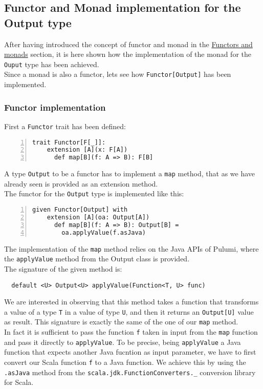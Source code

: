 \subsection{Functor and Monad implementation for the Output type}
After having introduced the concept of functor and monad in the \hyperref[sssec:functors-monads]{Functors and monads} section, it is here shown how the implementation of the monad for the \texttt{Ouput} type has been achieved.\\
Since a monad is also a functor, lets see how \texttt{Functor[Output]} has been implemented.

\subsubsection{Functor implementation}
First a \texttt{Functor} trait has been defined:\\
\begin{minipage}{\linewidth}
\begin{lstlisting}[numbers=left, numberstyle=\tiny, numbersep=-5pt, stepnumber=1, linewidth=420pt]
  trait Functor[F[_]]:
    extension [A](x: F[A])
      def map[B](f: A => B): F[B]
\end{lstlisting}
\end{minipage}
A type \texttt{Output} to be a functor has to implement a \texttt{map} method, that as we have already seen is provided as an extension method.\\
The functor for the \texttt{Output} type is implemented like this:\\
\begin{minipage}{\linewidth}
\begin{lstlisting}[numbers=left, numberstyle=\tiny, numbersep=-5pt, stepnumber=1, linewidth=420pt]
  given Functor[Output] with
    extension [A](oa: Output[A])
      def map[B](f: A => B): Output[B] =
        oa.applyValue(f.asJava)
\end{lstlisting}
\end{minipage}
The implementation of the \texttt{map} method relies on the Java APIs of Pulumi, where the \texttt{applyValue} method from the Output class is provided.\\
The signature of the given method is:
\begin{verbatim}
  default <U> Output<U> applyValue(Function<T, U> func)
\end{verbatim}
We are interested in observing that this method takes a function that transforms a value of a type \texttt{T} in a value of type \texttt{U}, and then it returns an \texttt{Output[U]} value as result.
This signature is exactly the same of the one of our \texttt{map} method.\\
In fact it is sufficient to pass the function \texttt{f} taken in input from the \texttt{map} function and pass it directly to \texttt{applyValue}.
To be precise, being \texttt{applyValue} a Java function that expects another Java fucntion as input parameter, we have to first convert our Scala function \texttt{f} to a Java function.
We achieve this by using the \texttt{.asJava} method from the \texttt{scala.jdk.FunctionConverters.\_} conversion library for Scala.

